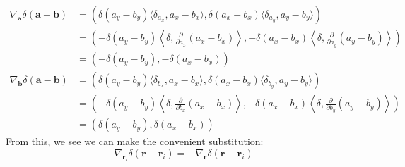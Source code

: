 \documentclass{article}
\begin{document}
\begin{align*}
\nabla_\mathbf{a}\delta(\mathbf{a}-\mathbf{b})&=\left(\delta(a_y-b_y)\langle \delta_{a_x},a_x-b_x\rangle,\delta(a_x-b_x)\langle \delta_{a_y},a_y-b_y\rangle\right)\\
&=\left(-\delta(a_y-b_y)\left\langle\delta,\frac{\partial}{\partial a_x}(a_x-b_x)\right\rangle,-\delta(a_x-b_x)\left\langle\delta,\frac{\partial}{\partial a_y}(a_y-b_y)\right\rangle\right)\\
&=(-\delta(a_y-b_y),-\delta(a_x-b_x))\\
\nabla_\mathbf{b}\delta(\mathbf{a}-\mathbf{b})&=\left(\delta(a_y-b_y)\langle \delta_{b_x},a_x-b_x\rangle,\delta(a_x-b_x)\langle \delta_{b_y},a_y-b_y\rangle\right)\\
&=\left(-\delta(a_y-b_y)\left\langle\delta,\frac{\partial}{\partial b_x}(a_x-b_x)\right\rangle,-\delta(a_x-b_x)\left\langle\delta,\frac{\partial}{\partial b_y}(a_y-b_y)\right\rangle\right)\\
&=(\delta(a_y-b_y),\delta(a_x-b_x))
\end{align*}From this, we see we can make the convenient substitution:
\begin{equation}
\nabla_{\mathbf{r}_i}\delta(\mathbf{r}-\mathbf{r}_i)=-\nabla_\mathbf{r}\delta(\mathbf{r}-\mathbf{r}_i)\label{delderivswitch}
\end{equation}
\end{document}
